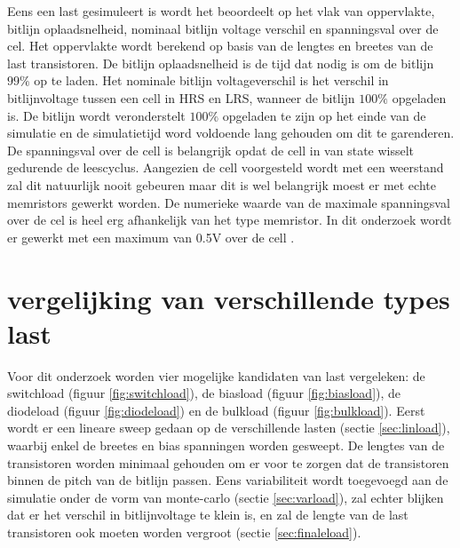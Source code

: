 Eens een last gesimuleert is wordt het beoordeelt op het vlak van oppervlakte, bitlijn oplaadsnelheid, nominaal bitlijn voltage verschil en spanningsval over de cel. Het oppervlakte wordt berekend op basis van de lengtes en breetes van de last transistoren. De bitlijn oplaadsnelheid is de tijd dat nodig is om de bitlijn $99\%$ op te laden. Het nominale bitlijn voltageverschil is het verschil in bitlijnvoltage tussen een cell in HRS en LRS, wanneer de bitlijn $100\%$ opgeladen is. De bitlijn wordt veronderstelt $100\%$ opgeladen te zijn op het einde van de simulatie en de simulatietijd word voldoende lang gehouden om dit te garenderen. De spanningsval over de cell is belangrijk opdat de cell in van state wisselt gedurende de leescyclus. Aangezien de cell voorgesteld wordt met een weerstand zal dit natuurlijk nooit gebeuren maar dit is wel belangrijk moest er met echte memristors gewerkt worden. De numerieke waarde van de maximale spanningsval over de cel is heel erg afhankelijk van het type memristor. In dit onderzoek wordt er gewerkt met een maximum van 0.5V over de cell \cite{ppt:model}.

\section{vergelijking van verschillende types last}
Voor dit onderzoek worden vier mogelijke kandidaten van last vergeleken: de switchload (figuur \ref{fig:switchload}), de biasload (figuur \ref{fig:biasload}), de diodeload (figuur \ref{fig:diodeload}) en de bulkload (figuur \ref{fig:bulkload})\cite{bulkload}. Eerst wordt er een lineare sweep gedaan op de verschillende lasten (sectie \ref{sec:linload}), waarbij enkel de breetes en bias spanningen worden gesweept. De lengtes van de transistoren worden minimaal gehouden om er voor te zorgen dat de transistoren binnen de pitch van de bitlijn passen. Eens variabiliteit wordt toegevoegd aan de simulatie onder de vorm van monte-carlo (sectie \ref{sec:varload}), zal echter blijken dat er het verschil in bitlijnvoltage te klein is, en zal de lengte van de last transistoren ook moeten worden vergroot (sectie \ref{sec:finaleload}).

